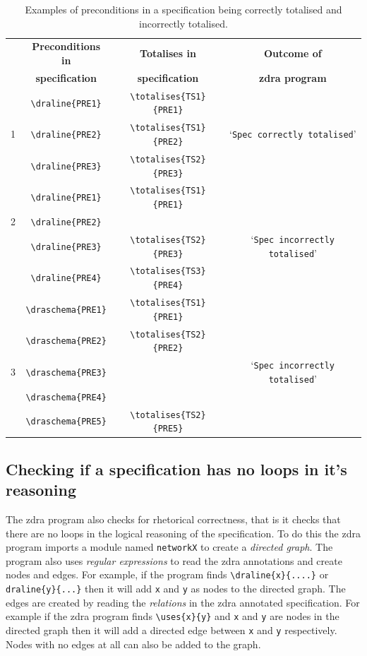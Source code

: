 \begin{table}[H]
\begin{tabular}{|c|c|c|c|}
\hline
& \textbf{Preconditions in} & \textbf{Totalises in} & \textbf{Outcome of} \\
& \textbf{specification} & \textbf{specification} & \textbf{\gls{zdra} program}
\\
\hline
\hline
& \verb|\draline{PRE1}| & \verb|\totalises{TS1}{PRE1}| & \\
1 & \verb|\draline{PRE2}| & \verb|\totalises{TS1}{PRE2}| & `\texttt{Spec
correctly totalised}' \\
& \verb|\draline{PRE3}| & \verb|\totalises{TS2}{PRE3}|& \\
\hline
& \verb|\draline{PRE1}| & \verb|\totalises{TS1}{PRE1}| &  \\
2 & \verb|\draline{PRE2}| & & \\
& \verb|\draline{PRE3}| & \verb|\totalises{TS2}{PRE3}|& `\texttt{Spec
incorrectly totalised}' \\
& \verb|\draline{PRE4}| & \verb|\totalises{TS3}{PRE4}|& \\
\hline
& \verb|\draschema{PRE1}| & \verb|\totalises{TS1}{PRE1}| &  \\
 & \verb|\draschema{PRE2}| & \verb|\totalises{TS2}{PRE2}| & \\
3 & \verb|\draschema{PRE3}| & & `\texttt{Spec incorrectly totalised}' \\
& \verb|\draschema{PRE4}| & & \\
& \verb|\draschema{PRE5}| & \verb|\totalises{TS2}{PRE5}|  & \\
\hline
\end{tabular}
\caption{\label{tab:totalisecorrect} Examples of preconditions in a specification being correctly totalised and incorrectly totalised.}
\end{table}

\subsection{Checking if a specification has no loops in it's reasoning}
\label{subsec:loops}

The \gls{zdra} program also checks for rhetorical correctness, that is it checks
that there are no loops in the logical reasoning of the specification. To do
this the \gls{zdra} program imports a module named \texttt{networkX} to create a
\emph{directed graph}. The program also uses \emph{regular expressions} to read
the \gls{zdra} annotations and create nodes and edges. For example, if the
program finds \verb|\draline{x}{....}| or \verb|draline{y}{...}| then it will
add \texttt{x} and \texttt{y} as nodes to the directed graph. The edges are
created by reading the \emph{relations} in the \gls{zdra} annotated
specification. For example if the \gls{zdra} program finds \verb|\uses{x}{y}|
and \texttt{x} and \texttt{y} are nodes in the directed graph then it will add a
directed edge between \texttt{x} and \texttt{y} respectively. Nodes with no
edges at all can also be added to the graph.

